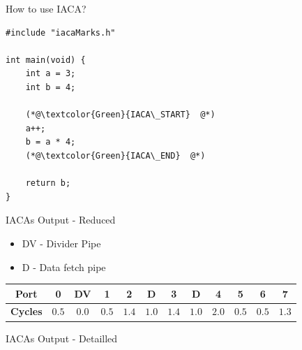\documentclass[10pt, tikz,border=2mm, xcolor=dvipsnames]{beamer}
\begin{document}
\begin{frame}[fragile]{How to use IACA?}

\begin{lstlisting}
#include "iacaMarks.h"

int main(void) {
    int a = 3;
    int b = 4;
    
    (*@\textcolor{Green}{IACA\_START}  @*)
    a++;
    b = a * 4;
    (*@\textcolor{Green}{IACA\_END}  @*)
    
    return b;
}
\end{lstlisting}
\end{frame}

\begin{frame}[fragile]{IACAs Output - Reduced}
\begin{itemize}
    \item DV - Divider Pipe
    \item D\phantom{V} - Data fetch pipe
\end{itemize}
\begin{center}
\begin{tabular}{|c|c c|c|c c|c c|c|c|c|c|}
  \hline
  \textbf{Port} & 0 & DV & 1 & 2 & D & 3 & D & 4 & 5 & 6 & 7 \\ \hline
  \textbf{Cycles} & $0.5$ & $0.0$ & $0.5$ & $1.4$ & $1.0$ & $1.4$ & $1.0$ & $2.0$ & $0.5$ & $0.5$ & $1.3$ \\
  \hline
\end{tabular}
\end{center}
\end{frame}

\begin{frame}[fragile]{IACAs Output - Detailled}
\hspace*{-0.6cm}
\end{frame}
\end{document}
